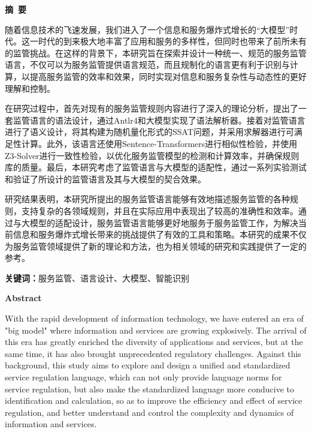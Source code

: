 \cleardoublepage{}
\begin{center}
    \bfseries {} 摘~要
\end{center}

随着信息技术的飞速发展，我们进入了一个信息和服务爆炸式增长的“大模型”时代。这一时代的到来极大地丰富了应用和服务的多样性，但同时也带来了前所未有的监管挑战。在这样的背景下，本研究旨在探索并设计一种统一、规范的服务监管语言，不仅可以为服务监管提供语言规范，而且规制化的语言更有利于识别与计算，以提高服务监管的效率和效果，同时实现对信息和服务复杂性与动态性的更好理解和控制。

在研究过程中，首先对现有的服务监管规则内容进行了深入的理论分析，提出了一套监管语言的语法设计，通过Antlr4和大模型实现了语法解析器。接着对监管语言进行了语义设计，将其构建为随机量化形式的SSAT问题，并采用求解器进行可满足性计算。此外，该语言还使用Sentence-Transformers进行相似性检验，并使用Z3-Solver进行一致性检验，以优化服务监管模型的检测和计算效率，并确保规则库的质量。最后，本研究考虑了监管语言与大模型的适配性，通过一系列实验测试和验证了所设计的监管语言及其与大模型的契合效果。

研究结果表明，本研究所提出的服务监管语言能够有效地描述服务监管的各种规则，支持复杂的各领域规则，并且在实际应用中表现出了较高的准确性和效率。通过与大模型的适配设计，服务监管语言能够更好地服务于服务监管工作，为解决当前信息和服务爆炸式增长带来的挑战提供了有效的工具和策略。本研究的成果不仅为服务监管领域提供了新的理论和方法，也为相关领域的研究和实践提供了一定的参考。

\vspace{1\baselineskip}
\noindent \textbf{关键词：}服务监管、语言设计、大模型、智能识别

\cleardoublepage{}
\begin{center}
    \bfseries {} Abstract
\end{center}

With the rapid development of information technology, we have entered an era of "big model" where information and services are growing explosively. The arrival of this era has greatly enriched the diversity of applications and services, but at the same time, it has also brought unprecedented regulatory challenges. Against this background, this study aims to explore and design a unified and standardized service regulation language, which can not only provide language norms for service regulation, but also make the standardized language more conducive to identification and calculation, so as to improve the efficiency and effect of service regulation, and better understand and control the complexity and dynamics of information and services.

